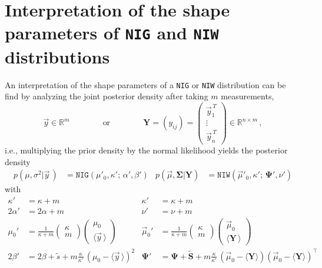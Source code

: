 \documentclass{article}
\begin{document}
\section{Interpretation of the shape parameters of \texttt{NIG} and \texttt{NIW} distributions}
\label{sec:appendix_niwshapeinter}
An interpretation of the shape parameters of a \texttt{NIG} or \texttt{NIW} distribution can be find by analyzing the joint posterior density after taking $m$ measurements, 
\begin{equation}
    \vec{y} \in \mathbb{R}^m
    \qquad\qquad
    \text{or}
    \qquad\qquad
    \bm{Y} = (y_{ij}) =
    \begin{pmatrix}
        \vec{y}_1^{\,T} \\
        \vdots \\
        \vec{y}_n^{\,T}
    \end{pmatrix}  \in \mathbb{R}^{n \times m} \,,
\end{equation}
i.e., multiplying the prior density by the normal likelihood yields the posterior density
\begin{align}
    p(\mu, \sigma^2 | \vec{y}\,) &= \texttt{NIG}(\mu'_0, \kappa';\, \alpha', \beta') &
    p(\vec{\mu}, \bm{\Sigma} | \bm{Y}) &= \texttt{NIW}(\vec{\mu}'_0, \kappa';\, \bm{\Psi}', \nu')
\end{align}
with
\begin{subequations}
    \label{eq:postdens}
    \begin{align}
        \kappa' &= \kappa + m &
        \kappa' &= \kappa + m \\
        2\alpha' &= 2\alpha + m &
        \nu' &= \nu + m \\
        \mu_0' &= \frac{1}{\kappa + m} \begin{pmatrix} \kappa \\ m \end{pmatrix} \begin{pmatrix} \mu_0 \\ \langle \vec{y} \, \rangle \end{pmatrix} &
        \vec{\mu}_0' &= \frac{1}{\kappa + m} \begin{pmatrix} \kappa \\ m \end{pmatrix} \begin{pmatrix} \vec{\mu}_0 \\ \langle \bm{Y} \, \rangle \end{pmatrix} \label{eq:postdens_mu} \\
        2\beta' &= 2\beta + \tilde{s} + m \frac{\kappa}{\kappa'} \, (\mu_0 - \langle \vec{y} \, \rangle)^2 &
        \bm{\Psi}' &= \bm{\Psi} + \bm{\tilde{S}} + m \frac{\kappa}{\kappa'} \, (\vec{\mu}_0 - \langle \bm{Y} \rangle) (\vec{\mu}_0 - \langle \bm{Y} \rangle)^\top \label{eq:postdens_var}
    \end{align}
\end{subequations}
\end{document}
